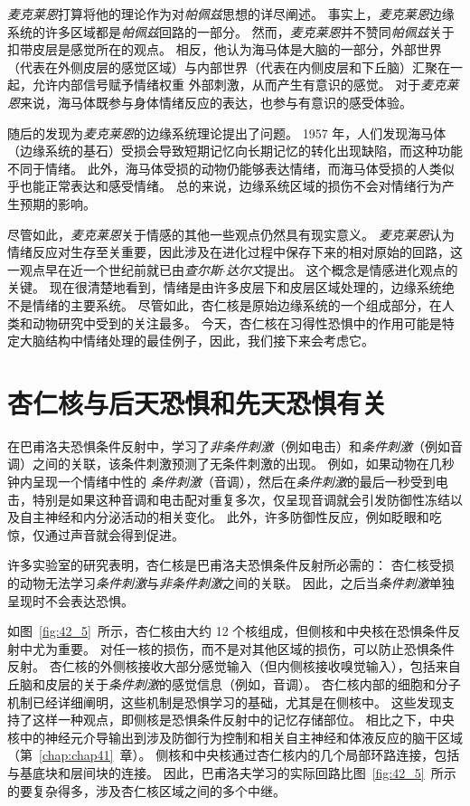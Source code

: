 \textit{麦克莱恩}打算将他的理论作为对\textit{帕佩兹}思想的详尽阐述。
事实上，\textit{麦克莱恩}边缘系统的许多区域都是\textit{帕佩兹}回路的一部分。
然而，\textit{麦克莱恩}并不赞同\textit{帕佩兹}关于扣带皮层是感觉所在的观点。
相反，他认为海马体是大脑的一部分，外部世界（代表在外侧皮层的感觉区域）与内部世界（代表在内侧皮层和下丘脑）汇聚在一起，允许内部信号赋予情绪权重 外部刺激，从而产生有意识的感觉。
对于\textit{麦克莱恩}来说，海马体既参与身体情绪反应的表达，也参与有意识的感受体验。


随后的发现为\textit{麦克莱恩}的边缘系统理论提出了问题。
1957 年，人们发现海马体（边缘系统的基石）受损会导致短期记忆向长期记忆的转化出现缺陷，而这种功能不同于情绪。
此外，海马体受损的动物仍能够表达情绪，而海马体受损的人类似乎也能正常表达和感受情绪。
总的来说，边缘系统区域的损伤不会对情绪行为产生预期的影响。


尽管如此，\textit{麦克莱恩}关于情感的其他一些观点仍然具有现实意义。
\textit{麦克莱恩}认为情绪反应对生存至关重要，因此涉及在进化过程中保存下来的相对原始的回路，这一观点早在近一个世纪前就已由\textit{查尔斯$\cdot$达尔文}提出。
这个概念是情感进化观点的关键。
现在很清楚地看到，情绪是由许多皮层下和皮层区域处理的，边缘系统绝不是情绪的主要系统。
尽管如此，杏仁核是原始边缘系统的一个组成部分，在人类和动物研究中受到的关注最多。
今天，杏仁核在习得性恐惧中的作用可能是特定大脑结构中情绪处理的最佳例子，因此，我们接下来会考虑它。



\section{杏仁核与后天恐惧和先天恐惧有关}

在巴甫洛夫恐惧条件反射中，学习了\textit{非条件刺激}（例如电击）和\textit{条件刺激}（例如音调）之间的关联，该条件刺激预测了无条件刺激的出现。
例如，如果动物在几秒钟内呈现一个情绪中性的 \textit{条件刺激}（音调），然后在\textit{条件刺激}的最后一秒受到电击，特别是如果这种音调和电击配对重复多次，仅呈现音调就会引发防御性冻结以及自主神经和内分泌活动的相关变化。
此外，许多防御性反应，例如眨眼和吃惊，仅通过声音就会得到促进。


许多实验室的研究表明，杏仁核是巴甫洛夫恐惧条件反射所必需的：
杏仁核受损的动物无法学习\textit{条件刺激}与\textit{非条件刺激}之间的关联。
因此，之后当\textit{条件刺激}单独呈现时不会表达恐惧。


如图~\ref{fig:42_5}~所示，杏仁核由大约 12 个核组成，但侧核和中央核在恐惧条件反射中尤为重要。
对任一核的损伤，而不是对其他区域的损伤，可以防止恐惧条件反射。
杏仁核的外侧核接收大部分感觉输入（但内侧核接收嗅觉输入），包括来自丘脑和皮层的关于\textit{条件刺激}的感觉信息（例如，音调）。
杏仁核内部的细胞和分子机制已经详细阐明，这些机制是恐惧学习的基础，尤其是在侧核中。
这些发现支持了这样一种观点，即侧核是恐惧条件反射中的记忆存储部位。
相比之下，中央核中的神经元介导输出到涉及防御行为控制和相关自主神经和体液反应的脑干区域（第~\ref{chap:chap41}~章）。
侧核和中央核通过杏仁核内的几个局部环路连接，包括与基底块和层间块的连接。
因此，巴甫洛夫学习的实际回路比图~\ref{fig:42_5}~所示的要复杂得多，涉及杏仁核区域之间的多个中继。


